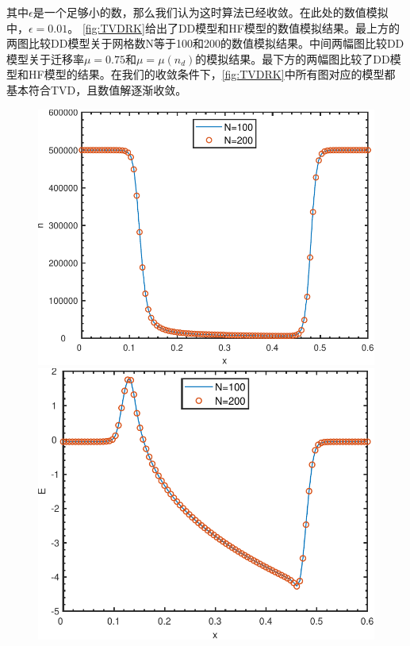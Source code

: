 其中$\epsilon$是一个足够小的数，那么我们认为这时算法已经收敛。在此处的数值模拟中，$\epsilon = 0.01$。
\autoref{fig:TVDRK}给出了DD模型和HF模型的数值模拟结果。最上方的两图比较DD模型关于网格数N等于100和200的数值模拟结果。中间两幅图比较DD模型关于迁移率$\mu=0.75$和$\mu = \mu(n_d)$的模拟结果。最下方的两幅图比较了DD模型和HF模型的结果。在我们的收敛条件下，\autoref{fig:TVDRK}中所有图对应的模型都基本符合TVD，且数值解逐渐收敛。
\begin{figure}
    \centering
    \begin{minipage}{0.48\textwidth}
        \centering
        \includegraphics[width=\linewidth]{figure/DDTVDRK3Degree2mu0.75Nn.pdf}
    \end{minipage}
    \begin{minipage}{0.48\textwidth}
        \centering
        \includegraphics[width=\linewidth]{figure/DDTVDRK3Degree2mu0.75NE.pdf}
    \end{minipage}


\end{figure}
